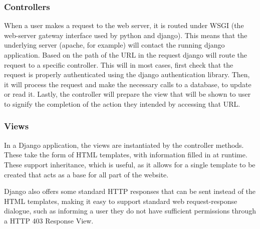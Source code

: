 \documentclass[a4paper,11pt]{report}
\begin{document}
\subsubsection{Controllers}
When a user makes a request to the web server, it is routed under WSGI (the web-server gateway interface used by python and django). This means that the underlying server (apache, for example) will contact the running django application. Based on the path of the URL in the request django will route the request to a specific controller. This will in most cases, first check that the request is properly authenticated using the django authentication library. Then, it will process the request and make the necessary calls to a database, to update or read it. Lastly, the controller will prepare the view that will be shown to user to signify the completion of the action they intended by accessing that URL.
\subsubsection{Views}
In a Django application, the views are instantiated by the controller methods. These take the form of HTML templates, with information filled in at runtime. These support inheritance, which is useful, as it allows for a single template to be created that acts as a base for all part of the website.\par
Django also offers some standard HTTP responses that can be sent instead of the HTML templates, making it easy to support standard web request-response dialogue, such as informing a user they do not have sufficient permissions through a HTTP 403 Response View.
\end{document}
